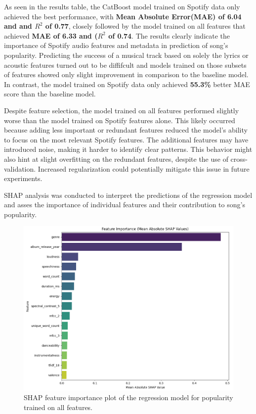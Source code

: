 As seen in the results table, the CatBoost model trained on Spotify data only
achieved the best performance, with \textbf{Mean Absolute Error(MAE) of
\textbf{6.04} and and $R^2$ of 0.77}, closely followed by the model trained on
all features that achieved \textbf{MAE of 6.33 and ($R^2$ of 0.74}. The results
clearly indicate the importance of Spotify audio features and metadata in
prediction of song's popularity. Predicting the success  of a musical track
based on solely the lyrics or acoustic features turned out to be diffifcult and
models trained on those subsets of features showed only slight improvement in
comparison to the baseline model. In contrast, the model trained on Spotify data only
achieved \textbf{55.3\%} better MAE score than the baseline model.

Despite feature selection, the model trained on all features performed slightly
worse than the model trained on Spotify features alone. This likely occurred
because adding less important or redundant features reduced the model's ability
to focus on the most relevant Spotify features. The additional features may
have introduced noise, making it harder to identify clear patterns. This
behavior might also hint at slight overfitting on the redundant features,
despite the use of cross-validation. Increased regularization could potentially
mitigate this issue in future experiments.


SHAP analysis was conducted to interpret the predictions of the regression
model and asses the importance of individual features and their contribution to
song's popularity.


\begin{center}
\begin{figure}[H]
  \centering
  \includegraphics[width=5in]{img/feature_importance_popularity_reg.png}
  \caption{SHAP feature importance plot of the regression model for popularity trained on all features.}
  \label{Figure:fig_beh}
\end{figure}
\end{center}


